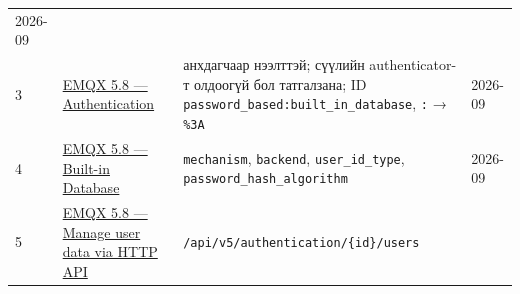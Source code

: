 \begin{longtable}[]{@{}llll@{}}
\begin{minipage}[t]{0.22\columnwidth}
2026-09\strut
\end{minipage}\tabularnewline
\begin{minipage}[t]{0.22\columnwidth}\raggedright
3\strut
\end{minipage} & \begin{minipage}[t]{0.22\columnwidth}\raggedright
\href{https://docs.emqx.com/en/emqx/v5.8/guides/access-control/authn/authn.html}{EMQX 5.\allowbreak{}8 --- Authentication}\strut
\end{minipage} & \begin{minipage}[t]{0.22\columnwidth}\raggedright
анхдагчаар нээлттэй; сүүлийн authenticator-т олдоогүй бол татгалзана; ID \texttt{password\_\allowbreak{}based:\allowbreak{}built\_\allowbreak{}in\_\allowbreak{}database}, \texttt{:} → \texttt{\%3A}\strut
\end{minipage} & \begin{minipage}[t]{0.22\columnwidth}\raggedright
2026-09\strut
\end{minipage}\tabularnewline
\begin{minipage}[t]{0.22\columnwidth}\raggedright
4\strut
\end{minipage} & \begin{minipage}[t]{0.22\columnwidth}\raggedright
\href{https://docs.emqx.com/en/emqx/v5.8/guides/access-control/authn/mnesia.html}{EMQX 5.\allowbreak{}8 --- Built-in Database}\strut
\end{minipage} & \begin{minipage}[t]{0.22\columnwidth}\raggedright
\texttt{mechanism}, \texttt{backend}, \texttt{user\_\allowbreak{}id\_\allowbreak{}type}, \texttt{password\_\allowbreak{}hash\_\allowbreak{}algorithm}\strut
\end{minipage} & \begin{minipage}[t]{0.22\columnwidth}\raggedright
2026-09\strut
\end{minipage}\tabularnewline
\begin{minipage}[t]{0.22\columnwidth}\raggedright
5\strut
\end{minipage} & \begin{minipage}[t]{0.22\columnwidth}\raggedright
\href{https://docs.emqx.com/en/emqx/v5.8/guides/access-control/authn/user_management.html}{EMQX 5.\allowbreak{}8 --- Manage user data via HTTP API}\strut
\end{minipage} & \begin{minipage}[t]{0.22\columnwidth}\raggedright
\texttt{/\allowbreak{}api/\allowbreak{}v5/\allowbreak{}authentication/\allowbreak{}\{id\}/users}\strut

\end{minipage}
\end{longtable}
